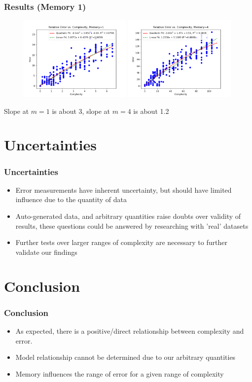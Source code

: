 \documentclass{beamer}
\begin{document}
\begin{frame}
    \frametitle{Results (Memory 1)}
    \begin{figure}[H]
        \centering
        \includegraphics[width=0.49\textwidth]{images/graph-mem1.png}
        \includegraphics[width=0.49\textwidth]{images/graph-mem4.png}
    \end{figure}
    Slope at $m=1$ is about 3, slope at $m=4$ is about 1.2
\end{frame}

\section{Uncertainties}
\begin{frame}
    \frametitle{Uncertainties}
    \begin{itemize}
   \item Error measurements have inherent uncertainty, but should have limited influence due to the quantity of data
    \item Auto-generated data, and arbitrary quantities raise doubts over validity of results, these questions could be answered by researching with 'real' datasets
    \item Further tests over larger ranges of complexity are necessary to further validate our findings
        \end{itemize}
\end{frame}

\section{Conclusion}
\begin{frame}
    \frametitle{Conclusion}
    \begin{itemize}
   \item As expected, there is a positive/direct relationship between complexity and error.
    \item Model relationship cannot be determined due to our arbitrary quantities
    \item Memory influences the range of error for a given range of complexity
        \end{itemize}
\end{frame}
\end{document}
